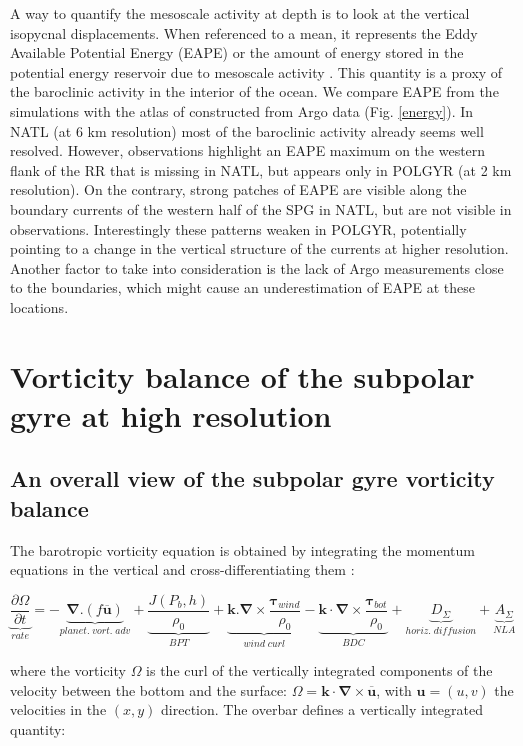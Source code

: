 \documentclass{ametsoc}
\begin{document}
A way to quantify the mesoscale activity at depth is to look at the vertical isopycnal displacements. When referenced to a mean, it represents the Eddy Available Potential Energy (EAPE) or the amount of energy stored in the potential energy reservoir due to mesoscale activity \citep{lorenz1955}. This quantity is a proxy of the baroclinic activity in the interior of the ocean. We compare EAPE from the simulations with the atlas of \citet{roullet2014} constructed from Argo data (Fig. \ref{energy}). In NATL (at 6 km resolution) most of the baroclinic activity already seems well resolved. However, observations highlight an EAPE maximum on the western flank of the RR that is missing in NATL, but appears only in POLGYR (at 2 km resolution). On the contrary, strong patches of EAPE are visible along the boundary currents of the western half of the SPG in NATL, but are not visible in observations. Interestingly these patterns weaken in POLGYR, potentially pointing to a change in the vertical structure of the currents at higher resolution. Another factor to take into consideration is the lack of Argo measurements close to the boundaries, which might cause an underestimation of EAPE at these locations.


\section{Vorticity balance of the subpolar gyre at high resolution}

\subsection{An overall view of the subpolar gyre vorticity balance}

The barotropic vorticity equation is obtained by integrating the momentum equations in the vertical and cross-differentiating them \citep{gula2015}:

$$\underbrace{\frac{\partial \Omega}{\partial t}}_{rate} = -\underbrace{\mathbf{\nabla}.(f \mathbf{\overline{u}})}_{planet.\;vort.\;adv}+\underbrace{\frac{J(P_b,h)}{\rho _0}}_{BPT} +\underbrace{\mathbf{k}.\mathbf{\nabla} \times \frac{\mathbf{\tau} _{wind}}{\rho_{0}}}_{wind\;curl} -\underbrace{\mathbf{k} \cdot \mathbf{\nabla} \times \frac{\mathbf{\tau} _{bot}}{\rho_{0}}}_{BDC} +\underbrace{D_{\Sigma}}_{horiz.\;diffusion}+\underbrace{A_{\Sigma}}_{NLA}$$

where the vorticity $\Omega$ is the curl of the vertically integrated components of the velocity between the bottom and the surface: $\Omega = \mathbf{k} \cdot \mathbf{\nabla} \times \overline{\mathbf{u}}$, with $\mathbf{u} = (u,v)$ the velocities in the $(x,y)$ direction. The overbar defines a vertically integrated quantity:
\end{document}
